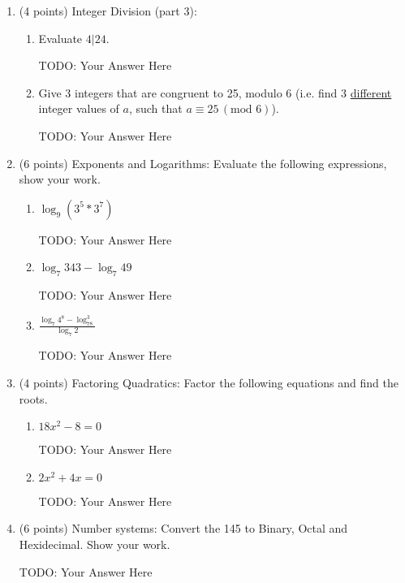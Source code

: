 \documentclass{article}
\begin{document}
\begin{enumerate}
    \item{\large (4 points) Integer Division (part 3):}
    \begin{enumerate}
        \item Evaluate $4|24$.
             
        {\color{red} TODO: Your Answer Here}
        
        \item Give 3 integers that are congruent to 25, modulo 6 (i.e. find 3 \underline{different} integer values of $a$, such that $a\equiv25 \,(\text{mod } 6)$).
             
        {\color{red} TODO: Your Answer Here}
        
    \end{enumerate}
    
    \item{\large (6 points) Exponents and Logarithms: Evaluate the following expressions, show your work.}
    \begin{enumerate}
         \item $\log_9 (3^5*3^7)$
              
        {\color{red} TODO: Your Answer Here}
        
         \item $\log_7 343 - \log_7 49$
              
        {\color{red} TODO: Your Answer Here}
        
         \item $\frac{\log_7 4^8-\log_78^3}{\log_7 2}$
              
        {\color{red} TODO: Your Answer Here}
        
    \end{enumerate}

    \item{\large (4 points) Factoring Quadratics: Factor the following equations and find the roots.}
    \begin{enumerate}
       \item $18x^2-8=0$
            
        {\color{red} TODO: Your Answer Here}
        
       \item $2x^2+4x=0$
            
        {\color{red} TODO: Your Answer Here}
        
    \end{enumerate}
    
    \item{\large (6 points) Number systems: Convert the 145 to Binary, Octal and Hexidecimal. Show your work.}
         
        {\color{red} TODO: Your Answer Here}
        
    
    
\end{enumerate}
\end{document}
